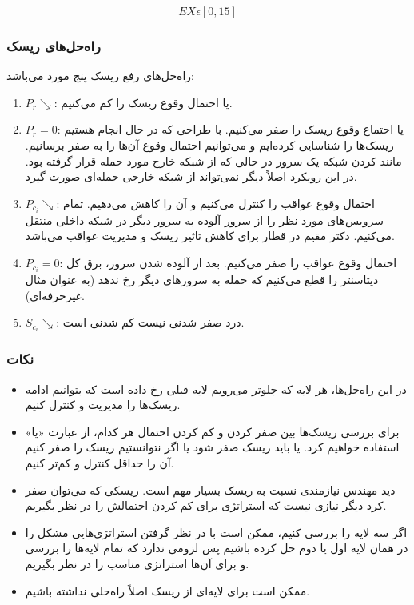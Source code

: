 \begin{equation}
    EX \epsilon [0, 15]
\end{equation}

\subsubsection{راه‌حل‌های ریسک}

راه‌حل‌های رفع ریسک پنج مورد می‌باشد:

\begin{enumerate}
    \item $P_{r} \searrow$: یا احتمال وقوع ریسک را کم می‌کنیم.
    \item $P_{r} = 0$: یا احتماع وقوع ریسک را صفر می‌کنیم. با طراحی که در حال
    انجام هستیم ریسک‌ها را شناسایی کرده‌ایم و می‌توانیم احتمال وقوع آن‌ها را به
    صفر برسانیم. مانند  کردن شبکه یک سرور در حالی که از شبکه
    خارج مورد حمله قرار گرفته بود. در این رویکرد اصلاً دیگر نمی‌تواند از شبکه
    خارجی حمله‌ای صورت گیرد.
    \item $P_{c_{i}} \searrow$: احتمال وقوع عواقب را کنترل می‌کنیم و آن را کاهش
    می‌دهیم. تمام سرویس‌های مورد نظر را از سرور آلوده به سرور دیگر در شبکه داخلی
    منتقل می‌کنیم. دکتر مقیم در قطار برای کاهش تاثیر ریسک و مدیریت عواقب می‌باشد.
    \item $P_{c_{i}} = 0$: احتمال وقوع عواقب را صفر می‌کنیم. بعد از آلوده شدن
    سرور، برق کل دیتاسنتر را قطع می‌کنیم که حمله به سرور‌های دیگر رخ ندهد (به
    عنوان مثال غیرحرفه‌ای).
    \item $S_{c_{i}} \searrow$: درد صفر شدنی نیست کم شدنی است.
\end{enumerate}

\subsubsection*{نکات}

\begin{itemize}
    \item در این راه‌حل‌ها، هر لایه که جلوتر می‌رویم لایه قبلی رخ داده است که
    بتوانیم ادامه ریسک‌ها را مدیریت و کنترل کنیم.
    \item برای بررسی ریسک‌ها بین صفر کردن و کم کردن احتمال هر کدام، از عبارت
    «یا» استفاده خواهیم کرد. یا باید ریسک صفر شود یا اگر نتوانستیم ریسک را صفر
    کنیم آن را حداقل کنترل و کم‌تر کنیم.
    \item دید مهندس نیازمندی نسبت به ریسک بسیار مهم است. ریسکی که می‌توان صفر
    کرد دیگر نیازی نیست که استراتژی برای کم کردن احتمالش را در نظر بگیریم.
    \item اگر سه لایه را بررسی کنیم، ممکن است با در نظر گرفتن استراتژی‌هایی مشکل
    را در همان لایه اول یا دوم حل کرده باشیم پس لزومی ندارد که تمام لایه‌ها را
    بررسی و برای آن‌ها استراتژی مناسب را در نظر بگیریم.
    \item ممکن است برای لایه‌ای از ریسک اصلاً راه‌حلی نداشته باشیم.
\end{itemize}


